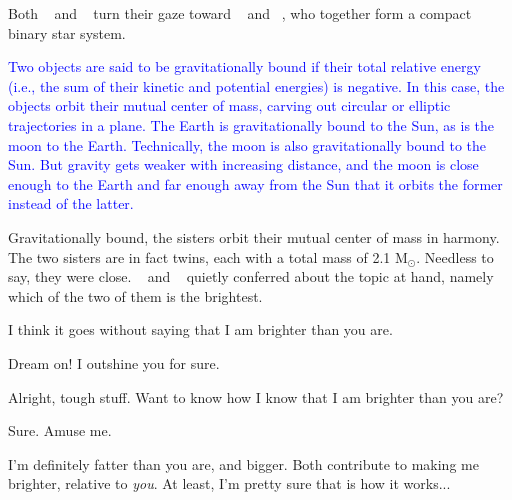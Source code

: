 \documentclass[main.tex]{subfiles}
\begin{document}
\par \nar Both \rmmaia~ and \rmelectra~ turn their gaze toward \rmtaygete~ and \rmalcyone~, who together form a compact binary star system.

\begin{tcolorbox}[sharp corners, colback=blue!30, colframe=blue!80!blue, title=Gravitationally Bound]
\par \textcolor{blue} {Two objects are said to be gravitationally bound if their total relative energy (i.e., the sum of their kinetic and potential energies) is negative.  In this case, the objects orbit their mutual center of mass, carving out circular or elliptic trajectories in a plane.  The Earth is gravitationally bound to the Sun, as is the moon to the Earth.  Technically, the moon is also gravitationally bound to the Sun.  But gravity gets weaker with increasing distance, and the moon is close enough to the Earth and far enough away from the Sun that it orbits the former instead of the latter.}  
\end{tcolorbox}

\par \nar Gravitationally bound, the sisters orbit their mutual center of mass in harmony.  The two sisters are in fact twins, each with a total mass of 2.1 M$_{\odot}$.  Needless to say, they were close.  \rmtaygete~ and \rmalcyone~ quietly conferred about the topic at hand, namely which of the two of them is the brightest.


\par \Taygete I think it goes without saying that I am brighter than you are.

\par \Alcyone Dream on!  I outshine you for sure.

\par \Taygete Alright, tough stuff.  Want to know how I know that I am brighter than you are?

\par \Alcyone Sure.  Amuse me.

\par \Taygete I'm definitely fatter than you are, and bigger.  Both contribute to making me brighter, relative to \textit{you}.  At least, I'm pretty sure that is how it works...  
\end{document}
